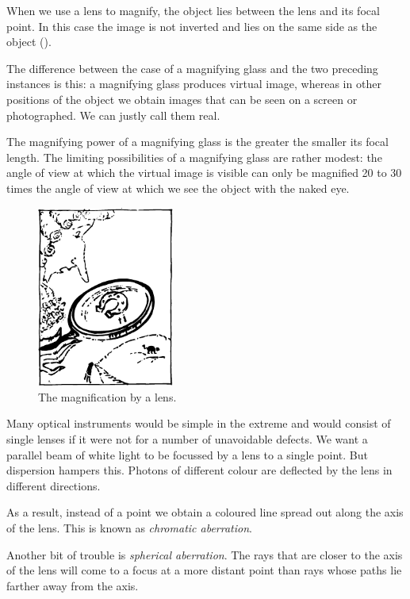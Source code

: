 When we use a lens to magnify, the object lies between the lens and its focal point. In this case the image is not inverted and lies on the same side as the object ().

The difference between the case of a magnifying glass and the two preceding instances is this: a magnifying glass produces virtual image, whereas in other positions of the object we obtain images that can be seen on a screen or photographed. We can justly call them real.

The magnifying power of a magnifying glass is the greater the smaller its focal length. The limiting possibil­ities of a magnifying glass are rather modest: the angle of view at which the virtual image is visible can only be magnified 20 to 30 times the angle of view at which we see the object with the naked eye.

\begin{figure}[!ht]
\centering
\includegraphics[width=0.4\textwidth]{figures/fig-02-02.pdf}
\caption{The magnification by a lens.}
\label{fig-2.2}
\end{figure}


Many optical instruments would be simple in the ex­treme and would consist of single lenses if it were not for a number of unavoidable defects. We want a parallel beam of white light to be focussed by a lens to a single point. But dispersion hampers this. Photons of different colour are deflected by the lens in different directions.

As a result, instead of a point we obtain a coloured line spread out along the axis of the lens. This is known as \emph{chromatic aberration}.

Another bit of trouble is \emph{spherical aberration}. The rays that are closer to the axis of the lens will come to a focus at a more distant point than rays whose paths lie farther away from the axis.

